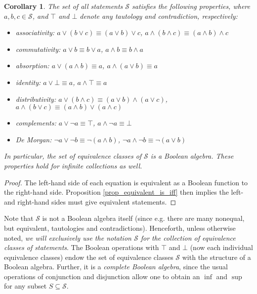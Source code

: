 \documentclass[psamsfonts]{amsart}
\newtheorem{cor}[thm]{Corollary}
\theoremstyle{definition}
\theoremstyle{remark}
\numberwithin{equation}{section}
\def\tautology{\top}
\def\contradiction{\bot}
\def\AND{\wedge}
\def\OR{\vee}
\def\NOT{\neg}
\begin{document}
\begin{cor}\label{boolean_properties}
		The set of all statements $\mathcal{S}$ satisfies the following properties, where $a,b,c\in\mathcal{S}$, and $\tautology$ and $\contradiction$ denote any tautology and contradiction, respectively:
		\begin{itemize}
			\item associativity: $a \OR (b \OR c) \equiv (a \OR b) \OR c$, $a \AND (b \AND c) \equiv (a \AND b) \AND c$
			\item commutativity: $a \OR b \equiv b \OR a$, $a \AND b \equiv b \AND a$
			\item absorption: $a \OR (a \AND b) \equiv a$, $a \AND (a \OR b) \equiv a$
			\item identity: $a \OR \contradiction \equiv a
			$, $a \AND \tautology \equiv a$
			\item distributivity: $a \OR (b \AND c) \equiv (a \OR b) \AND (a \OR c)$, $a \AND (b \OR c) \equiv (a \AND b) \OR (a \AND c)$
			\item complements: $a \OR \NOT a \equiv \tautology$, $a \AND \NOT a \equiv \contradiction$
			\item De Morgan: $\NOT a \OR \NOT b \equiv \NOT (a \AND b)$, $\NOT a \AND \NOT b \equiv \NOT (a \OR b)$
		\end{itemize}
		In particular, the set of equivalence classes of $\mathcal{S}$ is a Boolean algebra. These properties hold for infinite collections as well. 
	\end{cor}
\begin{proof}
The left-hand side of each equation is equivalent as a Boolean function to the right-hand side. Proposition \ref{prop_equivalent_is_iff} then implies the left- and right-hand sides must give equivalent statements. 
\end{proof}

Note that $\mathcal{S}$ is not a Boolean algebra itself (since e.g. there are many nonequal, but equivalent, tautologies and contradictions). Henceforth, unless otherwise noted, \emph{we will exclusively use the notation $\mathcal{S}$ for the collection of equivalence classes of statements}. The Boolean operations with $\tautology$ and $\contradiction$ (now each individual equivalence classes) endow the set of equivalence classes $\mathcal{S}$ with the structure of a Boolean algebra. Further, it is a \emph{complete Boolean algebra}, since the usual operations of conjunction and disjunction allow one to obtain an $\inf$ and $\sup$ for any subset $S\subseteq\mathcal{S}$. 
\end{document}
